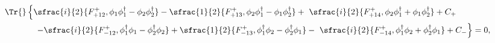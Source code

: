 \begin{equation}
\begin{split}
 \Tr{}&\left\{\sfrac{i}{2}\{F_{+12}^+,\phi_1\phi_1^\dagger
 -\phi_2\phi_2^\dagger\}-\sfrac{1}{2}\{F_{+13}^+,
       \phi_2\phi_1^\dagger-\phi_1\phi_2^\dagger\}
  +\,\,\sfrac{i}{2}\{F_{+14}^+,\phi_2\phi_1^\dagger
      +\phi_1\phi_2^\dagger\}+C_+\right.\\
 &\left.\quad - \sfrac{i}{2}\{F_{-12}^+,\phi_1^\dagger\phi_1
 -\phi_2^\dagger\phi_2\}+\sfrac{1}{2}\{F_{-13}^+,
       \phi_1^\dagger\phi_2-\phi_2^\dagger\phi_1\}
  -\,\,\sfrac{i}{2}\{F_{-14}^+,\phi_1^\dagger\phi_2
      +\phi_2^\dagger\phi_1\}+C_-\right\}=0,\label{eq:0}
\end{split}
\end{equation}

